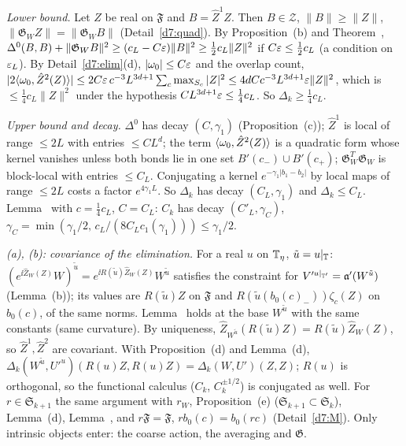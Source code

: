 \begin{detail}\label{d7:cov}
\begin{step}
\emph{Lower bound.} Let $Z$ be real on $\mathfrak F$ and $B=\hat Z^1Z$. Then $B\in\mathcal Z$, $\|B\|\ge\|Z\|$, $\|\mathfrak G_WZ\|=\|\mathfrak G_WB\|$ (Detail~\ref{d7:quad}). By Proposition~(b) and Theorem~, $\Delta^0(B,B)+\|\mathfrak G_WB\|^2\ge(c_L-C\varepsilon)\|B\|^2\ge\frac12c_L\|Z\|^2$ if $C\varepsilon\le\frac12c_L$ (a condition on $\varepsilon_L$). By Detail~\ref{d7:elim}(d), $|\omega_0|\le C\varepsilon$ and the overlap count, $|2\langle \omega_0,\hat Z^2(Z)\rangle|\le2C\varepsilon\,c^{-3}L^{3d+1}\sum_c\max_{S_c}|Z|^2\le4dC c^{-3}L^{3d+1}\varepsilon\|Z\|^2$, which is $\le\frac14c_L\|Z\|^2$ under the hypothesis $CL^{3d+1}\varepsilon\le\frac14c_L$. So $\Delta_k\ge\frac14c_L$.
\end{step}
\begin{step}
\emph{Upper bound and decay.} $\Delta^0$ has decay $(C,\gamma_1)$ (Proposition~(c)); $\hat Z^1$ is local of range $\le2L$ with entries $\le CL^d$; the term $\langle \omega_0,\hat Z^2(Z)\rangle$ is a quadratic form whose kernel vanishes unless both bonds lie in one set $B'(c_-)\cup B'(c_+)$; $\mathfrak G_W^T\mathfrak G_W$ is block-local with entries $\le C_L$. Conjugating a kernel $e^{-\gamma_1|b_1-b_2|}$ by local maps of range $\le2L$ costs a factor $e^{4\gamma_1L}$. So $\Delta_k$ has decay $(C_L,\gamma_1)$ and $\Delta_k\le C_L$. Lemma~ with $c=\frac14c_L$, $C=C_L$: $C_k$ has decay $(C'_L,\gamma_C)$, $\gamma_C=\min(\gamma_1/2,\,c_L/(8C_Lc_1(\gamma_1)))\le\gamma_1/2$.
\end{step}
\begin{step}
\emph{(a), (b): covariance of the elimination.} For a real $u$ on $\mathbb T_\eta$, $\tilde u=u|_\mathbb T$: $(e^{\ii\hat Z_W(Z)}W)^{\tilde u}=e^{\ii R(\tilde u)\hat Z_W(Z)}W^{\tilde u}$ satisfies the constraint for $V'^{u|_{\mathbb T'}}=\mathfrak a'(W^{\tilde u})$ (Lemma~(b)); its values are $R(\tilde u)Z$ on $\mathfrak F$ and $R(\tilde u(b_0(c)_-))\zeta_c(Z)$ on $b_0(c)$, of the same norms. Lemma~ holds at the base $W^{\tilde u}$ with the same constants (same curvature). By uniqueness, $\hat Z_{W^{\tilde u}}(R(\tilde u)Z)=R(\tilde u)\hat Z_W(Z)$, so $\hat Z^1,\hat Z^2$ are covariant. With Proposition~(d) and Lemma~(d), $\Delta_k(W^{\tilde u},U'^u)(R(u)Z,R(u)Z)=\Delta_k(W,U')(Z,Z)$; $R(u)$ is orthogonal, so the functional calculus ($C_k$, $C_k^{\pm1/2}$) is conjugated as well. For $r\in\mathfrak S_{k+1}$ the same argument with $r_W$, Proposition~(e) ($\mathfrak S_{k+1}\subset\mathfrak S_k$), Lemma~(d), Lemma~, and $r\mathfrak F=\mathfrak F$, $rb_0(c)=b_0(rc)$ (Detail~\ref{d7:M}). Only intrinsic objects enter: the coarse action, the averaging and $\mathfrak G$.
\end{step}
\end{detail}

